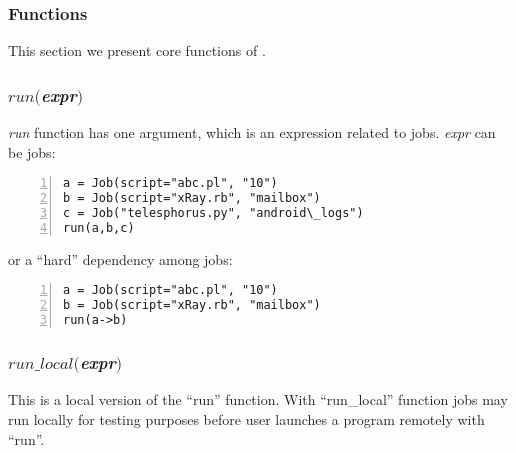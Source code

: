 
\subsubsection*{\lang{} Functions}

This section we present core functions of \lang{}.
\subsubsection*{$run($\textit{expr}$)$}
\textit{run} function has one argument, which is an expression related to jobs.
\textit{expr} can be jobs:
\begin{Verbatim}[numbers=left]
a = Job(script="abc.pl", "10")
b = Job(script="xRay.rb", "mailbox")
c = Job("telesphorus.py", "android\_logs")
run(a,b,c)
\end{Verbatim}

or a ``hard'' dependency among jobs:
\begin{Verbatim}[numbers=left]
a = Job(script="abc.pl", "10")
b = Job(script="xRay.rb", "mailbox")
run(a->b)
\end{Verbatim}
\subsubsection*{$run\_local($\textit{expr}$)$}
This is a local version of the ``run'' function.
With ``run\_local'' function jobs may run locally for testing purposes before
user launches a program remotely with ``run''.
